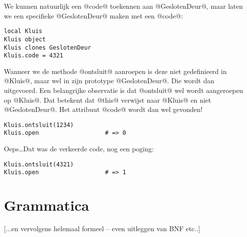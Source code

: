 We kunnen natuurlijk een @code@ toekennen aan @GeslotenDeur@, maar laten we een specifieke @GeslotenDeur@ maken met een @code@:
\begin{lstlisting}[name=deuren]
local Kluis
Kluis object
Kluis clones GeslotenDeur
Kluis.code = 4321
\end{lstlisting}
Wanneer we de methode @ontsluit@ aanroepen is deze niet gedefinieerd in @Kluis@, maar wel in zijn prototype @GeslotenDeur@. Die wordt dan uitgevoerd. Een belangrijke observatie is dat @ontsluit@ wel wordt aangeroepen op @Kluis@. Dat betekent dat @this@ verwijst naar @Kluis@ en niet @GeslotenDeur@. Het attribuut @code@ wordt dan wel gevonden!
\begin{lstlisting}[name=deuren]
Kluis.ontsluit(1234)
Kluis.open                   # => 0
\end{lstlisting}
Oeps\dots Dat was de verkeerde code, nog een poging:
\begin{lstlisting}[name=deuren]
Kluis.ontsluit(4321)
Kluis.open                   # => 1
\end{lstlisting}

\section{Grammatica}

[...en vervolgens helemaal formeel -- even uitleggen van BNF etc..]

